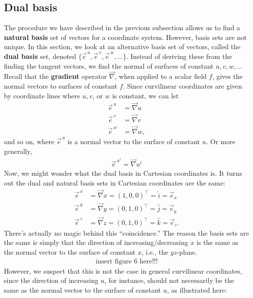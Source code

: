 \documentclass{article}
\theoremstyle{definition}
\begin{document}
\subsection{Dual basis}
The procedure we have described in the previous subsection allows us to find a \textbf{natural basis} set of vectors for a coordinate system. However, basis sets are not unique. In this section, we look at an alternative basis set of vectors, called the \textbf{dual basis} set, denoted $\{ \vec{e}^{\,u}, \vec{e}^{\,v}, \vec{e}^{\,w},\dots \}$. Instead of deriving these from the finding the tangent vectors, we find the normal of surfaces of constant $u,v,w,\dots$\\

Recall that the \textbf{gradient} operator $\vec{\nabla}$, when applied to a scalar field $f$, gives the normal vectors to surfaces of constant $f$. Since curvilinear coordinates are given by coordinate lines where $u,v$, or $w$ is constant, we can let
\begin{align*}
\vec{e}^{\,u} &= \vec{\nabla}u\\
\vec{e}^{\,v} &= \vec{\nabla}v\\
\vec{e}^{\,w} &= \vec{\nabla}w,
\end{align*}  
and so on, where $\vec{e}^{\,u}$ is a normal vector to the surface of constant $u$. Or more generally, 
\begin{align*}
\boxed{\vec{e}^{\,u^i} = \vec{\nabla}u^i}
\end{align*} 
Now, we might wonder what the dual basis in Cartesian coordinates is. It turns out the dual and natural basis sets in Cartesian coordinates are the same:
\begin{align*}
\vec{e}^{\,x} &= \vec{\nabla}x=(1,0,0)^\top=\hat{i} = \vec{e}_x \\
\vec{e}^{\,y} &= \vec{\nabla}y=(0,1,0)^\top=\hat{j} = \vec{e}_y \\
\vec{e}^{\,z} &= \vec{\nabla}z=(0,1,0)^\top=\hat{k} = \vec{e}_z.
\end{align*}
There's actually no magic behind this ``coincidence.'' The reason the basis sets are the same is simply that the direction of increasing/decreasing $x$ is the same as the normal vector to the surface of constant $x$, i.e., the $yz$-plane. 
\begin{align*}
\text{insert figure 6 here!!!}
\end{align*}
However, we suspect that this is not the case in general curvilinear coordinates, since the direction of increasing $u$, for instance, should not necessarily be the same as the normal vector to the surface of constant $u$, as illustrated here:
\end{document}
